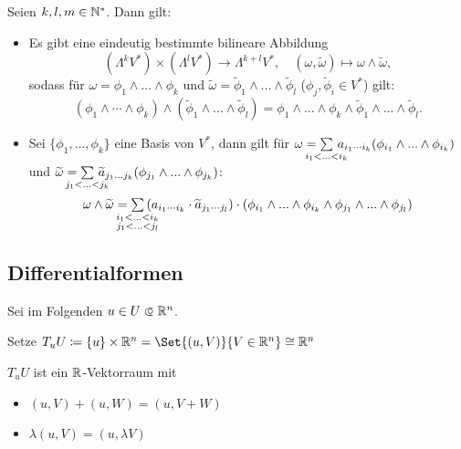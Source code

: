 \documentclass{cheat-sheet}
\begin{document}
\begin{satz}
  Seien $k, l, m \in \mathbb{N}^*$. Dann gilt:
  \begin{itemize}
    \item Es gibt eine eindeutig bestimmte bilineare Abbildung
    \[ (\Lambda^k V^*) \times (\Lambda^l V^*) \to \Lambda^{k+l} V^*, \quad (\omega, \widetilde{\omega}) \mapsto \omega \wedge \widetilde{\omega}, \]
    sodass für $\omega = \phi_1 \wedge ... \wedge \phi_k$ und $\widetilde{\omega} = \widetilde{\phi}_1 \wedge ... \wedge \widetilde{\phi}_l$ ($\phi_j, \widetilde{\phi}_i \in V^*$) gilt:
    \[ (\phi_1 \wedge \cdots \wedge \phi_k) \wedge (\widetilde{\phi}_1 \wedge ... \wedge \widetilde{\phi}_l) = \phi_1 \wedge ... \wedge \phi_k \wedge \widetilde{\phi}_1 \wedge ... \wedge \widetilde{\phi}_l. \]
    \item Sei $\{ \phi_1 , ..., \phi_k \}$ eine Basis von $V^*$, dann gilt für $\omega = \sum_{\mathclap{i_1 < ... < i_k}} \, a_{i_1 \cdots i_k} (\phi_{i_1} \wedge ... \wedge \phi_{i_k})$ und $\widetilde{\omega} = \sum_{\mathclap{j_1 < ... < j_k}} \, \widetilde{a}_{j_1 ... j_k} (\phi_{j_1} \wedge ... \wedge \phi_{j_k})$:
    \[ \omega \wedge \widetilde{\omega} = \sum_{\mathclap{\substack{i_1 < ... < i_k \\ j_1 < ... < j_l}}} \, (a_{i_1 \cdots i_k} \cdot \widetilde{a}_{j_1 \cdots j_l}) \cdot (\phi_{i_1} \wedge ... \wedge \phi_{i_k} \wedge \phi_{j_1} \wedge ... \wedge \phi_{j_l}) \]
  \end{itemize}
\end{satz}


\subsection{Differentialformen}


\begin{nota}
  Sei im Folgenden $u \in U \opn \R^n$.

  Setze $T_u U \coloneqq \{ u \} \times \R^n = \Set{ (u, V) }{ V \in \R^n } \cong \R^n$
\end{nota}

\begin{bem}
  $T_u U$ ist ein $\mathbb{R}$-Vektorraum mit
  \begin{multicols}{2}
    \begin{itemize}
      \item $(u, V) + (u, W) = (u, V + W)$
      \item $\lambda (u, V) = (u, \lambda V)$
    \end{itemize}
  \end{multicols}
\end{bem}
\end{document}
